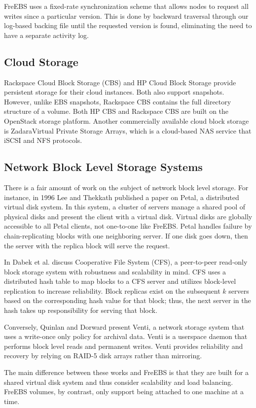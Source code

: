 FreEBS uses a fixed-rate synchronization scheme that allows nodes to request 
all writes since a particular version. This is done by backward traversal 
through our log-based backing file until the requested version is found, 
eliminating the need to have a separate activity log.


\subsection{Cloud Storage}
Rackspace Cloud Block Storage (CBS) and HP Cloud Block Storage provide 
persistent storage for their cloud instances\cite{rackspace, hp}. Both also 
support snapshots. However, unlike EBS snapshots, Rackspace CBS contains the 
full directory structure of a volume. Both HP CBS and Rackspace CBS are 
built on the OpenStack storage platform. Another commercially available 
cloud block storage is Zadara\texttrademark Virtual Private Storage 
Arrays\cite{zadara}, which is a cloud-based NAS service that iSCSI and NFS 
protocols.  

\subsection{Network Block Level Storage Systems}
There is a fair amount of work on the subject of network block level storage.
For instance, in 1996 Lee and Thekkath published a paper on Petal, a 
distributed virtual disk system\cite{lee1996petal}. In this system, a cluster
of servers manage a shared pool of physical disks and present the client 
with a virtual disk. Virtual disks are globally accessible to all
Petal clients, not one-to-one like FreEBS. Petal handles failure by 
chain-replicating blocks with one neighboring server. If one disk goes down,
then the server with the replica block will serve the request. 

In \cite{dabek2001wide} Dabek et al. discuss Cooperative File System (CFS), 
a peer-to-peer read-only block storage system with robustness and 
scalability in mind. CFS uses a distributed hash table to map blocks to a CFS
server and utilizes block-level replication to increase reliability. 
Block replicas exist on the subsequent $k$ servers based on the corresponding
hash value for that block; thus, the next server in the hash takes up 
responsibility for serving that block.  

Conversely, Quinlan and Dorward present Venti, a network storage system that
uses a write-once only policy for archival data\cite{quinlan2002venti}. Venti
is a userspace daemon that performs block level reads and permanent writes. 
Venti provides reliability and recovery by relying on RAID-5 disk arrays 
rather than mirroring.  

The main difference between these works and FreEBS is that they are built 
for a shared virtual disk system and thus consider scalability and load
balancing. FreEBS volumes, by contrast, only support being attached to one 
machine at a time.


